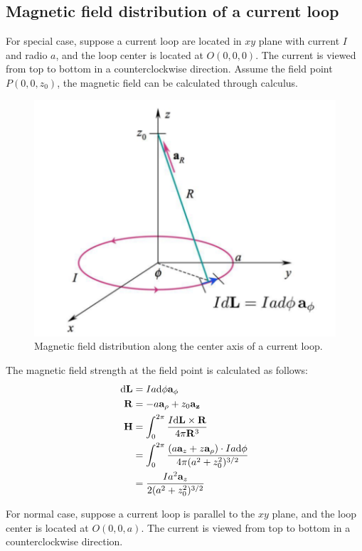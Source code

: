 \documentclass[journal,twocolumn,letterpaper]{IEEEJERM}
\begin{document}
\subsection{Magnetic field distribution of a current loop}
For special case, suppose a current loop are located in $ xy $ plane with current $ I $ and radio $ a $, and the loop center is located at $ O(0,0,0) $. The current is viewed from top to bottom in a counterclockwise direction. Assume the field point $ P(0,0,z_0) $, the magnetic field can be calculated through calculus.
\begin{figure}[H]   
	\centering	        \includegraphics[width=0.8\linewidth]{Fig2.png}
	\caption{Magnetic field distribution along the center axis of a current loop.}	  
	\label{fig2} 
\end{figure}
The magnetic field strength at the field point is calculated as follows:
\begin{align}
\mathrm{d}\mathbf{L}&=Ia\mathrm{d}\phi \mathbf{a}_{\phi}\notag \\
\mathbf{R}&=-a\mathbf{a}_{\rho}+z_0\mathbf{a_z} \notag \\
\mathbf{H}&=\int_0^{2\pi} \dfrac{I\mathrm{d}\mathbf{L}\times \mathbf{R}}{4\pi \mathbf{R}^3} \notag \\&=\int_0^{2\pi} \dfrac{(a\mathbf{a}_z+z\mathbf{a}_{\rho}  )\cdot Ia\mathrm{d}\phi}{4\pi(a^2+z_0^2)^{3/2}} \notag \\
&=\dfrac{Ia^2\mathbf{a}_z}{2(a^2+z_0^2)^{3/2}}
\end{align}

For normal case, suppose a current loop is parallel to the $ xy $ plane, and the loop center is located at $ O(0,0,a) $. The current is viewed from top to bottom in a counterclockwise direction.
\end{document}
